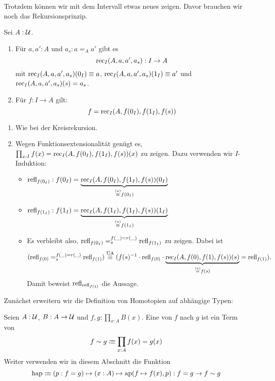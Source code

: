Trotzdem können wir mit dem Intervall etwas neues zeigen.
Davor brauchen wir noch das Rekursionsprinzip.
\begin{lemma}
  Sei $A:\mathcal{U}$.
  \begin{enumerate}
  \item Für $a,a':A$ und $a_s:a=_A a'$ gibt es
    \[
      \mathrm{rec}_{I}(A,a,a',a_s):I\to A
    \]
    mit $\mathrm{rec}_{I}(A,a,a',a_s)(0_I)\equiv a$, $\mathrm{rec}_{I}(A,a,a',a_s)(1_I)\equiv a'$ und $\mathrm{rec}_{I}(A,a,a',a_s)(s) = a_s$.
  \item Für $f:I\to A$ gilt:
    \[
      f=\mathrm{rec}_{I}(A,f(0_I),f(1_I),f(s))
    \]
  \end{enumerate}
\end{lemma}
\begin{beweis}
  \begin{enumerate}
  \item Wie bei der Kreisrekursion.
  \item
    Wegen Funktionsextensionalität genügt es, $\prod_{x : I} f(x) = \mathrm{rec}_{I}(A, f(0_I), f(1_I), f(s))(x)$ zu zeigen.
    Dazu verwenden wir $I$-Induktion:
    \begin{itemize}
      \item $\mathrm{refl}_{f(0_I)} : f(0_I) = \underbrace{\mathrm{rec}_{I}(A, f(0_I), f(1_I), f(s))(0_I)}_{\overset{(a)}{\equiv} f(0_I)}$
      \item $\mathrm{refl}_{f(1_I)} : f(1_I) = \underbrace{\mathrm{rec}_{I}(A, f(1_I), f(1_I), f(s))(1_I)}_{\overset{(a)}{\equiv} f(1_I)}$
      \item Es verbleibt also, $\mathrm{refl}_{f(0_I)} =_s^{f(\_) = r(\_)} \mathrm{refl}_{f(1_I)}$ zu zeigen.
        Dabei ist
        \[ ( \mathrm{refl}_{f(0)} =_s^{f(\_) = r(\_)} \mathrm{refl}_{f(1)} ) \overset{\text{ÜA}}\equiv (f(s)^{-1} \cdot \mathrm{refl}_{f(0)} \cdot \underbrace{\mathrm{rec}_{I}(A, f(0), f(1), f(s))(s)}_{\overset{(a)}{=} f(s)} = \mathrm{refl}_{f(1)}). \]
        Damit beweist $\mathrm{refl}_{\mathrm{refl}_{f(1)}}$ die Aussage.
    \end{itemize}
  \end{enumerate}
\end{beweis}

Zunächst erweitern wir die Definition von Homotopien auf abhängige Typen:
\begin{definition}
  Seien $A:\mathcal{U}$, $B:A\to \mathcal{U}$ und $f,g:\prod_{x:A}B(x)$. Eine \index{$\sim$} von $f$ nach $g$ ist ein Term von
  \[
    f\sim g\vcentcolon\mspace{-1.2mu}\equiv \prod_{x:A}f(x)=g(x)
  \]
  Weiter verwenden wir in diesem Abschnitt die Funktion
  \[
    \mathrm{hap}\vcentcolon\mspace{-1.2mu}\equiv (p:f=g)\mapsto (x:A)\mapsto\mathrm{ap}(f\mapsto f(x),p) :f=g\to f\sim g
  \]
\end{definition}

